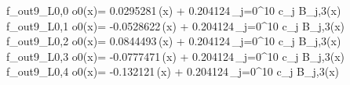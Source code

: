 f_{out9_L0,0	o0}(x)= 0.0295281\,\phi(x) + 0.204124\,\sum_{j=0}^{10} c_j B_{j,3}(x)
f_{out9_L0,1	o0}(x)= -0.0528622\,\phi(x) + 0.204124\,\sum_{j=0}^{10} c_j B_{j,3}(x)
f_{out9_L0,2	o0}(x)= 0.0844493\,\phi(x) + 0.204124\,\sum_{j=0}^{10} c_j B_{j,3}(x)
f_{out9_L0,3	o0}(x)= -0.0777471\,\phi(x) + 0.204124\,\sum_{j=0}^{10} c_j B_{j,3}(x)
f_{out9_L0,4	o0}(x)= -0.132121\,\phi(x) + 0.204124\,\sum_{j=0}^{10} c_j B_{j,3}(x)
